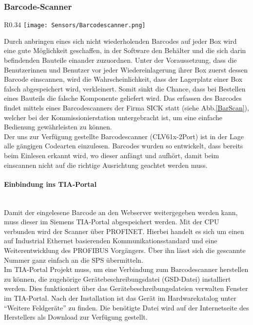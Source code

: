 \subsubsection{Barcode-Scanner}
\begin{wrapfigure}{R}{0.34\textwidth}
    \vspace{-20px}
    \texttt{[image: Sensors/Barcodescanner.png]}
    \caption{Barcodescanner CLV61x-2Port}
    \label{BarScan}
\end{wrapfigure}

Durch anbringen eines sich nicht wiederholenden Barcodes auf jeder Box wird eine gute Möglichkeit geschaffen, in der Software den Behälter und die sich darin befindenden Bauteile einander zuzuordnen. Unter der Voraussetzung, dass die Benutzerinnen und Benutzer vor jeder Wiedereinlagerung ihrer Box zuerst dessen Barcode einscannen, wird die Wahrscheinlichkeit, dass der Lagerplatz einer Box falsch abgespeichert wird, verkleinert. Somit sinkt die Chance, dass bei Bestellen eines Bauteils die falsche Komponente geliefert wird. Das erfassen des Barcodes findet mittels eines Barcodescanners der Firma SICK statt (siehe Abb.\ref{BarScan}), welcher bei der Kommissionierstation untergebracht ist, um eine einfache Bedienung gewährleisten zu können.\\
Der uns zur Verfügung gestellte Barcodescanner (CLV61x-2Port) ist in der Lage alle gängigen Codearten einzulesen.\cite{Barcodescanner} Barcodes wurden so entwickelt, dass bereits beim Einlesen erkannt wird, wo dieser anfängt und aufhört, damit beim einscannen nicht auf die richtige Ausrichtung geachtet werden muss.

\paragraph{Einbindung ins TIA-Portal \cite{BarScan_Handbuch}}\mbox{}\\
Damit der eingelesene Barcode an den Webserver weitergegeben werden kann, muss dieser im Siemens TIA-Portal abgespeichert werden. Mit der CPU verbunden wird der Scanner über PROFINET. Hierbei handelt es sich um einen auf Industrial Ethernet basierenden Kommunikationsstandard und eine Weiterentwicklung des PROFIBUS Vorgängers. Über ihn lässt sich die gescannte Nummer ganz einfach an die SPS übermitteln.\\
Im TIA-Portal Projekt muss, um eine Verbindung zum Barcodescanner herstellen zu können, die zugehörige Gerätebeschreibungsdatei (GSD-Datei) installiert werden. Dies funktioniert über das Gerätebeschreibungsdateien verwalten Fenster im TIA-Portal. Nach der Installation ist das Gerät im Hardwarekatalog unter \enquote{Weitere Feldgeräte} zu finden. Die benötigte Datei wird auf der Internetseite des Herstellers als Download zur Verfügung gestellt.

